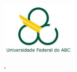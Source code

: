 \thispagestyle{empty}

\begin{center}
	\includegraphics[height=2.7cm, keepaspectratio=true]{figuras/logo-ufabc}

	\MakeUppercase{\imprimirinstituicao\space-\space\pInstituicaoSigla}
	
	\pCurso
\end{center}

\vfill

\begin{center}
	{\Large \bfseries \imprimirtitulo}
\end{center}

\vspace{6cm}

\begin{center}
	{\imprimirautor}
\end{center}

\vspace{0,5cm}

\begin{center}
	{\imprimirlocal}
	
	{\imprimirdata}
\end{center}
